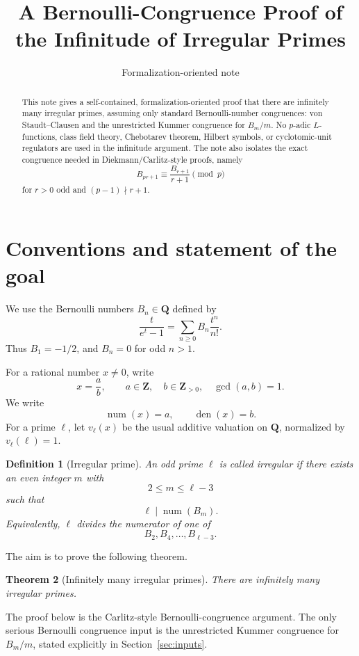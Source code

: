 \documentclass[11pt]{article}
\title{A Bernoulli-Congruence Proof of the Infinitude of Irregular Primes}
\author{Formalization-oriented note}
\date{}
\newtheorem{theorem}{Theorem}[section]
\newtheorem{definition}[theorem]{Definition}
\newcommand{\Z}{\mathbf Z}
\newcommand{\Q}{\mathbf Q}
\newcommand{\num}{\operatorname{num}}
\newcommand{\den}{\operatorname{den}}
\begin{document}
\maketitle

\begin{abstract}
This note gives a self-contained, formalization-oriented proof that there are infinitely many irregular primes, assuming only standard Bernoulli-number congruences: von Staudt--Clausen and the unrestricted Kummer congruence for $B_m/m$.  No $p$-adic $L$-functions, class field theory, Chebotarev theorem, Hilbert symbols, or cyclotomic-unit regulators are used in the infinitude argument.  The note also isolates the exact congruence needed in Diekmann/Carlitz-style proofs, namely
\[
  B_{pr+1} \equiv \frac{B_{r+1}}{r+1} \pmod p
\]
for $r>0$ odd and $(p-1)\nmid r+1$.
\end{abstract}

\tableofcontents

\section{Conventions and statement of the goal}

We use the Bernoulli numbers $B_n\in\Q$ defined by
\[
  \frac{t}{e^t-1}=\sum_{n\ge 0}B_n\frac{t^n}{n!}.
\]
Thus $B_1=-1/2$, and $B_n=0$ for odd $n>1$.

For a rational number $x\ne0$, write
\[
  x=\frac{a}{b},\qquad a\in\Z,
  \quad b\in\Z_{>0},\quad \gcd(a,b)=1.
\]
We write
\[
  \num(x)=a,
  \qquad
  \den(x)=b.
\]
For a prime $\ell$, let $v_\ell(x)$ be the usual additive valuation on $\Q$, normalized by $v_\ell(\ell)=1$.

\begin{definition}[Irregular prime]
An odd prime $\ell$ is called \emph{irregular} if there exists an even integer $m$ with
\[
  2\le m\le \ell-3
\]
such that
\[
  \ell\mid \num(B_m).
\]
Equivalently, $\ell$ divides the numerator of one of
\[
  B_2,B_4,\dots,B_{\ell-3}.
\]
\end{definition}

The aim is to prove the following theorem.

\begin{theorem}[Infinitely many irregular primes]
There are infinitely many irregular primes.
\end{theorem}

The proof below is the Carlitz-style Bernoulli-congruence argument.  The only serious Bernoulli congruence input is the unrestricted Kummer congruence for $B_m/m$, stated explicitly in Section~\ref{sec:inputs}.
\end{document}
